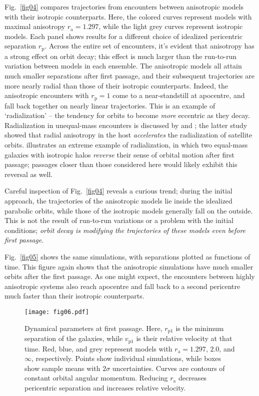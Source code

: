 \documentclass[fleqn,usenatbib]{mnras}
\begin{document}
Fig.~\ref{fig04} compares trajectories from encounters between anisotropic models with their isotropic counterparts. Here, the colored curves represent models with maximal anisotropy $r_\mathrm{a} = 1.297$, while the light grey curves represent isotropic models. Each panel shows results for a different choice of idealized pericentric separation $r_\mathrm{p}$. Across the entire set of encounters, it's evident that anisotropy has a strong effect on orbit decay; this effect is much larger than the run-to-run variation between models in each ensemble. The anisotropic models all attain much smaller separations after first passage, and their subsequent trajectories are more nearly radial than those of their isotropic counterparts. Indeed, the anisotropic encounters with $r_\mathrm{p} = 1$ come to a near-standstill at apocentre, and fall back together on nearly linear trajectories. This is an example of `radialization' -- the tendency for orbits to become \textit{more} eccentric as they decay. Radialization in unequal-mass encounters is discussed by \citet{Amorisco2017} and \citet{Vasiliev2022}; the latter study showed that radial anisotropy in the host \textit{accelerates} the radialization of satellite orbits. \citet{Barnes2016} illustrates an extreme example of radialization, in which two equal-mass galaxies with isotropic halos \textit{reverse} their sense of orbital motion after first passage; passages closer than those considered here would likely exhibit this reversal as well.

Careful inspection of Fig.~\ref{fig04} reveals a curious trend; during the initial approach, the trajectories of the anisotropic models lie inside the idealized parabolic orbits, while those of the isotropic models generally fall on the outside. This is not the result of run-to-run variations or a problem with the initial conditions; \textit{orbit decay is modifying the trajectories of these models even before first passage}. 

Fig.~\ref{fig05} shows the same simulations, with separations plotted as functions of time. This figure again shows that the anisotropic simulations have much smaller orbits after the first passage. As one might expect, the encounters between highly anisotropic systems also reach apocentre and fall back to a second pericentre much faster than their isotropic counterparts. 

\begin{figure*}
    \centering
    \texttt{[image: fig06.pdf]}
    \caption{Dynamical parameters at first passage. Here, $r_\mathrm{p1}$ is the minimum separation of the galaxies, while $v_\mathrm{p1}$ is their relative velocity at that time. Red, blue, and grey represent models with $r_\mathrm{a}=1.297$, $2.0$, and $\infty$, respectively. Points show individual simulations, while boxes show sample means with $2 \sigma$ uncertainties. Curves are contours of constant orbital angular momentum. Reducing $r_\mathrm{a}$ decreases pericentric separation and increases relative velocity.}
   \label{fig06}
\end{figure*}
\end{document}
